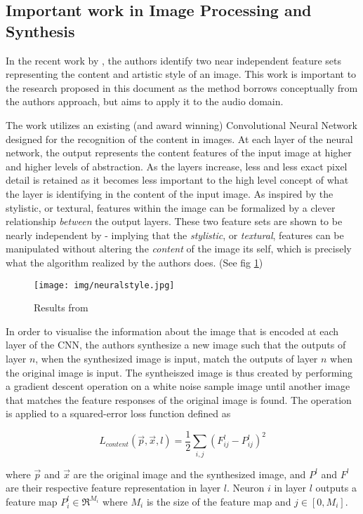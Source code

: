 \documentclass[12pt]{article}
\begin{document}
\subsection{Important work in Image Processing and Synthesis}
In the recent work by \citet{gatys2015neural}, the authors identify two near independent feature sets representing the content and artistic style of an image. This work is important to the research proposed in this document as the method borrows conceptually from the authors approach, but aims to apply it to the audio domain.

The work utilizes an existing (and award winning) Convolutional Neural Network designed for the recognition of the content in images. At each layer of the neural network, the output represents the content features of the input image at higher and higher levels of abstraction. As the layers increase, less and less exact pixel detail is retained as it becomes less important to the high level concept of what the layer is identifying in the content of the input image. As inspired by \citet{gatys2015texture} the stylistic, or textural, features within the image can be formalized by a clever relationship \emph{between} the output layers. These two feature sets are shown to be nearly independent by \citet{gatys2015neural} - implying that the \emph{stylistic}, or \emph{textural}, features can be manipulated without altering the \emph{content} of the image its self, which is precisely what the algorithm realized by the authors does. (See fig \ref{fig:neurlstyle})

\begin{figure}
  \texttt{[image: img/neuralstyle.jpg]}
  \caption{Results from \citet{gatys2015neural}}
  \label{fig:neurlstyle}
\end{figure}

In order to visualise the information about the image that is encoded at each layer of the CNN, the authors synthesize a new image such that the outputs of layer $n$, when the synthesized image is input, match the outputs of layer $n$ when the original image is input. The syntheiszed image is thus created by performing a gradient descent operation on a white noise sample image until another image that matches the feature responses of the original image is found. The operation is applied to a squared-error loss function defined as

$$L_{content}(\vec{p}, \vec{x}, l) = \frac{1}{2}\sum_{i,j}(F^{l}_{ij} - P^{l}_{ij})^2$$

where $\vec{p}$ and $\vec{x}$ are the original image and the synthesized image, and $P^l$ and $F^l$ are their respective feature representation in layer $l$. Neuron $i$ in layer $l$ outputs a feature map $P^{l}_{i} \in \Re^{M_i}$ where $M_i$ is the size of the feature map and $j \in [0, M_i]$.
\end{document}
